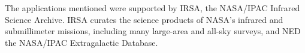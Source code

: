 \documentclass[11pt,twoside]{article}
\begin{document}
\smallskip
The applications mentioned were supported by IRSA, the NASA/IPAC Infrared Science Archive. IRSA curates the science
products of NASA's infrared and submillimeter missions, including many large-area and all-sky surveys, and NED the NASA/IPAC Extragalactic Database.

\end{document}
